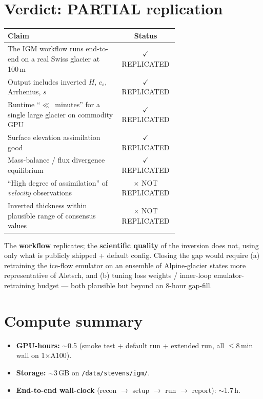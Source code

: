 \documentclass[11pt]{article}
\begin{document}
\section{Verdict: PARTIAL replication}
\begin{center}\small
\begin{tabular}{p{0.66\linewidth}c}
\toprule
Claim & Status \\
\midrule
The IGM workflow runs end-to-end on a real Swiss glacier at 100\,m       & $\checkmark$ REPLICATED \\
Output includes inverted $H$, $c_s$, Arrhenius, $s$                       & $\checkmark$ REPLICATED \\
Runtime ``$\ll$~minutes'' for a single large glacier on commodity GPU     & $\checkmark$ REPLICATED \\
Surface elevation assimilation good                                       & $\checkmark$ REPLICATED \\
Mass-balance / flux divergence equilibrium                                & $\checkmark$ REPLICATED \\
``High degree of assimilation'' of \emph{velocity} observations           & $\times$ NOT REPLICATED \\
Inverted thickness within plausible range of consensus values             & $\times$ NOT REPLICATED \\
\bottomrule
\end{tabular}
\end{center}
The \textbf{workflow} replicates; the \textbf{scientific quality} of the inversion does
not, using only what is publicly shipped + default config. Closing the gap would require
(a) retraining the ice-flow emulator on an ensemble of Alpine-glacier states more
representative of Aletsch, and (b) tuning loss weights / inner-loop emulator-retraining
budget --- both plausible but beyond an 8-hour gap-fill.

\section{Compute summary}
\begin{itemize}
\item \textbf{GPU-hours:} $\sim$0.5 (smoke test + default run + extended run, all
$\le$8\,min wall on 1$\times$A100).
\item \textbf{Storage:} $\sim$3\,GB on \texttt{/data/stevens/igm/}.
\item \textbf{End-to-end wall-clock} (recon $\to$ setup $\to$ run $\to$ report): $\sim$1.7\,h.
\end{itemize}
\end{document}
